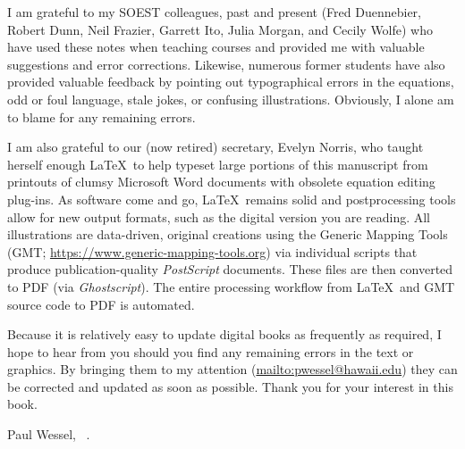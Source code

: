 I am grateful to my SOEST colleagues, past and present (Fred Duennebier, Robert Dunn, Neil Frazier,
Garrett Ito, Julia Morgan, and Cecily Wolfe) who have used these notes when teaching
courses and provided me with valuable suggestions and error corrections.  Likewise, numerous former students have
also provided valuable feedback by pointing out typographical errors in the equations, odd or foul language,
stale jokes, or confusing illustrations.  Obviously, I alone am to blame for any remaining errors.

I am also grateful to our (now retired) secretary, Evelyn Norris,
who taught herself enough \LaTeX\ to help typeset large portions of this manuscript from printouts of clumsy Microsoft Word documents
with obsolete equation editing plug-ins.  As software come and go, \LaTeX\ remains solid and postprocessing tools allow
for new output formats, such as the digital version you are reading.  All illustrations are data-driven, original creations using the
Generic Mapping Tools (GMT; \url{https://www.generic-mapping-tools.org}) via individual scripts that produce
publication-quality \emph{PostScript} documents.  These files are then converted to PDF (via \emph{Ghostscript}).  The entire
processing workflow from \LaTeX\ and GMT source code to PDF is automated.

Because it is relatively easy to update digital books as frequently as required, I hope to hear from you should you find any remaining errors
in the text or graphics.  By bringing them to my attention (\url{mailto:pwessel@hawaii.edu})
they can be corrected and updated as soon as possible.  Thank you for your interest in this book.

\vspace{2\baselineskip}
Paul Wessel, \DAmonth\ \DAyear.
